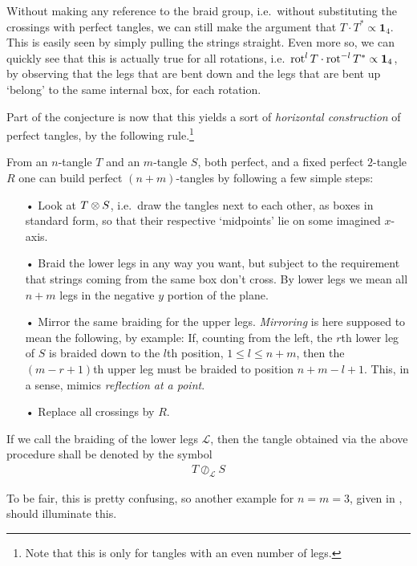 Without making any reference to the braid group, i.e.\ without substituting the crossings with perfect tangles, we can still make the argument that $T\cdot T^*\propto \mathbf{1}_4$. This is easily seen by simply pulling the strings straight. Even more so, we can quickly see that this is actually true for all rotations, i.e.\ $\operatorname{rot}^l T \cdot \operatorname{rot}^{-l}T^* \propto \mathbf{1}_4$, by observing that the legs that are bent down and the legs that are bent up `belong' to the same internal box, for each rotation.

Part of the conjecture is now that this yields a sort of \emph{horizontal construction} of perfect tangles, by the following rule.\footnote{Note that this is only for tangles with an even number of legs.}
\begin{conjecture}
From an $n$-tangle $T$ and an $m$-tangle $S$, both perfect, and a fixed perfect $2$-tangle $R$ one can build perfect $(n+m)$-tangles by following a few simple steps:
\begin{itemize}
\item[•] Look at $T\otimes S$, i.e.\ draw the tangles next to each other, as boxes in standard form, so that their respective `midpoints' lie on some imagined $x$-axis.
\item[•] Braid the lower legs in any way you want, but subject to the requirement that strings coming from the same box don't cross. By lower legs we mean all $n+m$ legs in the negative $y$ portion of the plane.
\item[•] Mirror the same braiding for the upper legs. \emph{Mirroring} is here supposed to mean the following, by example: If, counting from the left, the $r$th lower leg of $S$ is braided down to the $l$th position, $1\leq l \leq n+m$, then the $(m-r+1)$th upper leg must be braided to position $n+m-l+1$. This, in a sense, mimics \emph{reflection at a point}.
\item[•] Replace all crossings by $R$.
\end{itemize}
If we call the braiding of the lower legs $\mathcal{L}$, then the tangle obtained via the above procedure shall be denoted by the symbol 
\begin{align*}
T \oslash_\mathcal{L} S
\end{align*}
\end{conjecture}
To be fair, this is pretty confusing, so another example for $n=m=3$, given in , should illuminate this. 
